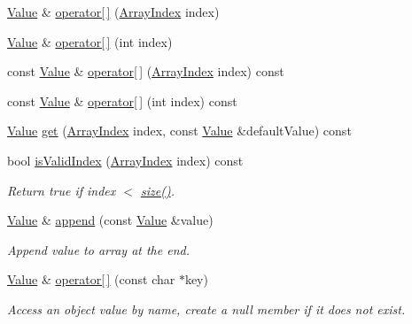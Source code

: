 \begin{DoxyCompactItemize}
\item 
\hyperlink{class_json_1_1_value}{Value} \& \hyperlink{class_json_1_1_value_a7d99f5dba388cdaa152ce6ef933d64ef}{operator\mbox{[}$\,$\mbox{]}} (\hyperlink{class_json_1_1_value_a184a91566cccca7b819240f0d5561c7d}{Array\-Index} index)
\item 
\hyperlink{class_json_1_1_value}{Value} \& \hyperlink{class_json_1_1_value_ac9182982c361e0ab621134d406e5f250}{operator\mbox{[}$\,$\mbox{]}} (int index)
\item 
const \hyperlink{class_json_1_1_value}{Value} \& \hyperlink{class_json_1_1_value_af151919e8947c430e34bed2b0b128601}{operator\mbox{[}$\,$\mbox{]}} (\hyperlink{class_json_1_1_value_a184a91566cccca7b819240f0d5561c7d}{Array\-Index} index) const 
\item 
const \hyperlink{class_json_1_1_value}{Value} \& \hyperlink{class_json_1_1_value_af9e02b38f4e63e491c300c20b275bdd7}{operator\mbox{[}$\,$\mbox{]}} (int index) const 
\item 
\hyperlink{class_json_1_1_value}{Value} \hyperlink{class_json_1_1_value_a28282c9b76fa031eba7a1843c47c16fe}{get} (\hyperlink{class_json_1_1_value_a184a91566cccca7b819240f0d5561c7d}{Array\-Index} index, const \hyperlink{class_json_1_1_value}{Value} \&default\-Value) const 
\item 
bool \hyperlink{class_json_1_1_value_aaa82ebb4b730ea1567d310874f47d147}{is\-Valid\-Index} (\hyperlink{class_json_1_1_value_a184a91566cccca7b819240f0d5561c7d}{Array\-Index} index) const 
\begin{DoxyCompactList}\small\item\em Return true if index $<$ \hyperlink{class_json_1_1_value_a4ca8ee6c48a34ca6c2f131956bab5e05}{size()}. \end{DoxyCompactList}\item 
\hyperlink{class_json_1_1_value}{Value} \& \hyperlink{class_json_1_1_value_a7e49ac977e4bcf59745a09d426669f75}{append} (const \hyperlink{class_json_1_1_value}{Value} \&value)
\begin{DoxyCompactList}\small\item\em Append value to array at the end. \end{DoxyCompactList}\item 
\hyperlink{class_json_1_1_value}{Value} \& \hyperlink{class_json_1_1_value_acb912f4ec40a25ea6eb387730885f3d9}{operator\mbox{[}$\,$\mbox{]}} (const char $\ast$key)
\begin{DoxyCompactList}\small\item\em Access an object value by name, create a null member if it does not exist. \end{DoxyCompactList}\item 

\end{DoxyCompactItemize}

